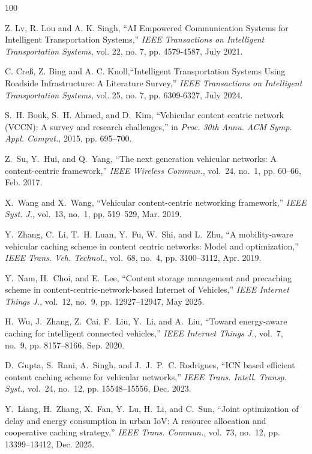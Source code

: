 \documentclass[journal]{IEEEtran}
\begin{document}
\begin{thebibliography}{100}

Z. Lv, R. Lou and A. K. Singh, ``AI Empowered Communication Systems for Intelligent Transportation Systems,'' \emph{IEEE Transactions on Intelligent Transportation Systems}, vol. 22, no. 7, pp. 4579-4587, July 2021.

C. Creß, Z. Bing and A. C. Knoll,``Intelligent Transportation Systems Using Roadside Infrastructure: A Literature Survey,'' \emph{IEEE Transactions on Intelligent Transportation Systems}, vol. 25, no. 7, pp. 6309-6327, July 2024.

S.~H. Bouk, S.~H. Ahmed, and D.~Kim, ``Vehicular content centric network (VCCN): A survey and research challenges,'' in \textit{Proc. 30th Annu. ACM Symp. Appl. Comput.}, 2015, pp. 695--700.

Z.~Su, Y.~Hui, and Q.~Yang, ``The next generation vehicular networks: A content-centric framework,'' \textit{IEEE Wireless Commun.}, vol.~24, no.~1, pp. 60--66, Feb. 2017.

X.~Wang and X.~Wang, ``Vehicular content-centric networking framework,'' \textit{IEEE Syst. J.}, vol.~13, no.~1, pp. 519--529, Mar. 2019.

Y.~Zhang, C.~Li, T.~H. Luan, Y.~Fu, W.~Shi, and L.~Zhu, ``A mobility-aware vehicular caching scheme in content centric networks: Model and optimization,'' \textit{IEEE Trans. Veh. Technol.}, vol.~68, no.~4, pp. 3100--3112, Apr. 2019.

Y.~Nam, H.~Choi, and E.~Lee, ``Content storage management and precaching scheme in content-centric-network-based Internet of Vehicles,'' \textit{IEEE Internet Things J.}, vol.~12, no.~9, pp. 12927--12947, May 2025.

H.~Wu, J.~Zhang, Z.~Cai, F.~Liu, Y.~Li, and A.~Liu, ``Toward energy-aware caching for intelligent connected vehicles,'' \textit{IEEE Internet Things J.}, vol.~7, no.~9, pp. 8157--8166, Sep. 2020.

D.~Gupta, S.~Rani, A.~Singh, and J.~J.~P.~C. Rodrigues, ``ICN based efficient content caching scheme for vehicular networks,'' \textit{IEEE Trans. Intell. Transp. Syst.}, vol.~24, no.~12, pp. 15548--15556, Dec. 2023.

Y.~Liang, H.~Zhang, X.~Fan, Y.~Lu, H.~Li, and C.~Sun, ``Joint optimization of delay and energy consumption in urban IoV: A resource allocation and cooperative caching strategy,'' \textit{IEEE Trans. Commun.}, vol.~73, no.~12, pp. 13399--13412, Dec. 2025.


\end{thebibliography}
\end{document}
